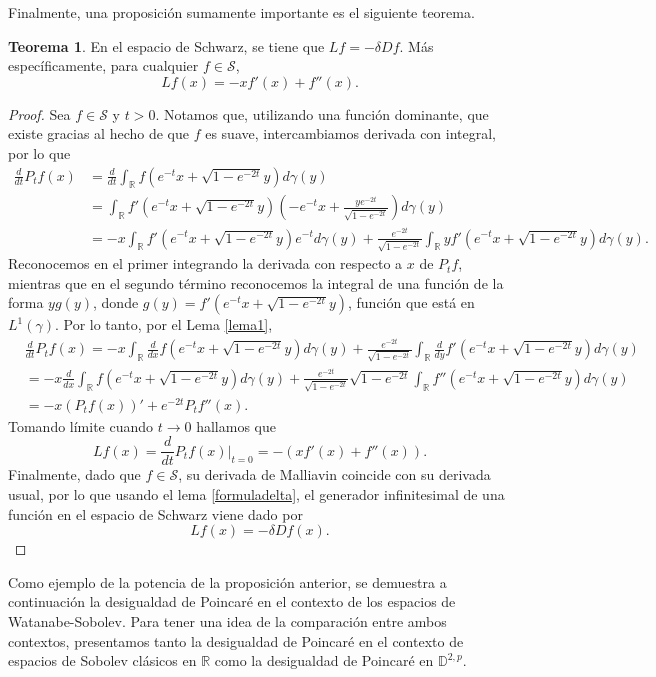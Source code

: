 \documentclass[letterpaper,twoside,12pt]{book}
\newcommand{\R}{\mathbb{R}}
\newcommand{\D}{\mathbb{D}}
\renewcommand{\S}{\mathcal{S}}
\newcommand{\1}{\mathds{1}}
\renewcommand{\to}{\rightarrow}
\theoremstyle{definition}
\theoremstyle{definition}
\newtheorem{teo}{Teorema}
\theoremstyle{remark}
\theoremstyle{definition}
\theoremstyle{definition}
\theoremstyle{definition}
\theoremstyle{definition}
\theoremstyle{definition}
\begin{document}
Finalmente, una proposición sumamente importante es el siguiente teorema.
\begin{teo} 
En el espacio de Schwarz, se tiene que $Lf=-\delta Df$. Más específicamente, para cualquier $f\in \S$, 
\[
Lf(x)=-xf'(x)+f''(x).   
\]
\end{teo}
 \begin{proof} 
   Sea $f\in \S$ y $t>0$. Notamos que, utilizando una función dominante, que existe gracias al hecho de que $f$ es suave, intercambiamos derivada con integral, por lo que
   \begin{align*}
    \frac{d}{dt}P_tf(x)&=\frac{d}{dt}\int_\R f(e^{-t}x+\sqrt{1-e^{-2t}}y)d\gamma(y)\\
    &=\int_\R f'(e^{-t}x+\sqrt{1-e^{-2t}}y)\left(-e^{-t}x+\frac{ye^{-2t}}{\sqrt{1-e^{-2t}}}\right)d\gamma(y)\\
    &=-x\int_\R f'(e^{-t}x+\sqrt{1-e^{-2t}}y)e^{-t}d\gamma(y)+\frac{e^{-2t}}{\sqrt{1-e^{-2t}}}\int_\R yf'(e^{-t}x+\sqrt{1-e^{-2t}}y)d\gamma(y).
   \end{align*}
   Reconocemos en el primer integrando la derivada con respecto a $x$ de $P_tf$, mientras que en el segundo término reconocemos la integral de una función de la forma $yg(y)$, donde $g(y)=f'(e^{-t}x+\sqrt{1-e^{-2t}}y)$, función que está en $L^1(\gamma)$. Por lo tanto, por el Lema \ref{lema1}, 
    \begin{align*}
        &\frac{d}{dt}P_tf(x)=-x\int_\R \frac{d}{dx}f(e^{-t}x+\sqrt{1-e^{-2t}}y)d\gamma(y)+\frac{e^{-2t}}{\sqrt{1-e^{-2t}}}\int_\R \frac{d}{dy}f'(e^{-t}x+\sqrt{1-e^{-2t}}y)d\gamma(y)\\
        &=-x\frac{d}{dx}\int_\R f(e^{-t}x+\sqrt{1-e^{-2t}}y)d\gamma(y)+\frac{e^{-2t}}{\sqrt{1-e^{-2t}}}\sqrt{1-e^{-2t}}\int_\R f''(e^{-t}x+\sqrt{1-e^{-2t}}y)d\gamma(y)\\
        &=-x(P_tf(x))'+e^{-2t}P_tf''(x).
    \end{align*}
    Tomando límite cuando $t\to0$ hallamos que 
    \[
    Lf(x)=\frac{d}{dt}P_tf(x)\bigg|_{t=0}=-\left(xf'(x)+f''(x)\right).
    \]
    Finalmente, dado que $f\in \S$, su derivada de Malliavin coincide con su derivada usual, por lo que usando el lema \ref{formuladelta}, el generador infinitesimal de una función en el espacio de Schwarz viene dado por 
    \[
    Lf(x)=-\delta Df(x).
    \]
  \end{proof}
Como ejemplo de la potencia de la proposición anterior, se demuestra a continuación la desigualdad de Poincaré en el contexto de los espacios de Watanabe-Sobolev.
Para tener una idea de la comparación entre ambos contextos, presentamos tanto la desigualdad de Poincaré en el contexto de espacios de Sobolev clásicos en $\R$ como la desigualdad de Poincaré en $\D^{2,p}$.
\end{document}
